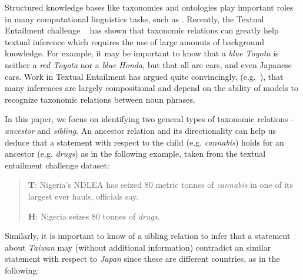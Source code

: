 
Structured knowledge bases like taxonomies and ontologies play
important roles in many computational linguistics tasks, such as
\cite{HSS03,673659}. Recently, the Textual Entailment challenge
~\cite{DaganGlMa06} has shown that taxonomic relations can greatly
help textual inference which requires the use of large amounts of
background knowledge. For example, it may be important to know that a
{\em blue Toyota} is neither a {\em red Toyota} nor a {\em blue
  Honda}, but that all are cars, and even Japanese cars. Work in
Textual Entailment has argued quite convincingly,
(e.g.~\cite{maccartney-manning:2008:PAPERS}), that many inferences are
largely compositional and depend on the ability of models to recognize
taxonomic relations between noun phrases.

In this paper, we focus on identifying two general types of taxonomic
relations - {\em ancestor} and {\em sibling}. An ancestor relation and
its directionality can help us deduce that a statement with respect to
the child (e.g. {\em cannabis}) holds for an ancestor (e.g. {\em
  drugs}) as in the following example, taken from the textual
entailment challenge dataset:

{\small
  \begin{quote}
    {\bf T}: Nigeria's NDLEA has seized 80 metric tonnes of {\em
      cannabis} in one of its largest ever hauls, officials say.

    {\bf H}: Nigeria seizes 80 tonnes of {\em drugs}.
  \end{quote}
}

Similarly, it is important to know of a sibling relation to infer that
a statement about {\em Taiwan} may (without additional information)
contradict an similar statement with respect to {\em Japan} since
these are different countries, as in the following:

